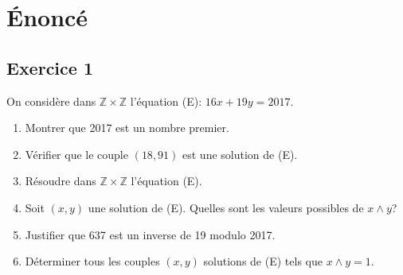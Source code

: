\documentclass{article}
\begin{document}
\section*{Énoncé}

\subsection*{Exercice 1}

On considère dans $\mathbb{Z} \times \mathbb{Z}$ l'équation (E): $16x+19y=2017$.

\begin{enumerate}
    \item Montrer que 2017 est un nombre premier.
    \item Vérifier que le couple $(18,91)$ est une solution de (E).
    \item Résoudre dans $\mathbb{Z} \times \mathbb{Z}$ l'équation (E).
    \item Soit $(x,y)$ une solution de (E). Quelles sont les valeurs possibles de $x \wedge y$?
    \item Justifier que 637 est un inverse de 19 modulo 2017.
    \item Déterminer tous les couples $(x,y)$ solutions de (E) tels que $x \wedge y=1$.
\end{enumerate}
\end{document}
